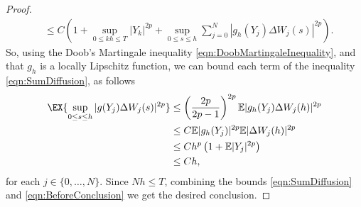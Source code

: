 \begin{proof}
\begin{align}
		&\leq 
			C
			\left(
				1
				+
				\sup_{0\leq kh\leq T} 
					|Y_k|^{2p}
					+
					\sup_{0\leq s\leq h}
						\sum_{j=0}^N
							|g_h(Y_j)\Delta W_j(s)|^{2p}
			\right) \label{eqn:SumDiffusion}.
	\end{align}
	So, using the Doob's Martingale inequality \eqref{eqn:DoobMartingaleInequality},
	 and that $g_h$ is a locally 
	Lipschitz function, we can bound each term of the inequality \eqref{eqn:SumDiffusion},  as follows
	\begin{align}
		\EX{
			\sup_{0 \leq s \leq h} |g(Y_j) \Delta W_j(s)|^{2p}
		}
		&\leq
			\left(
				\frac{2p}{2p-1}
			\right)^{2p}
			\m|g_h(Y_j)\Delta W_j(h)|^{2p}
			\notag
			\\
		&\leq
			C \m |g_h(Y_j)|^{2p} \m |\Delta W_j(h)|^{2p} \notag\\
		&\leq
			C h^p
			\left(
				1 + \m|Y_j|^{2p}
			\right) \notag \\
		& \leq C h, \label{eqn:BeforeConclusion}
	\end{align}
	for each $j \in \{0,\dots, N\}$.
	Since $Nh\leq T$, combining the bounds \eqref{eqn:SumDiffusion} and \eqref{eqn:BeforeConclusion} we 
	get the desired conclusion.
	\end{proof}

